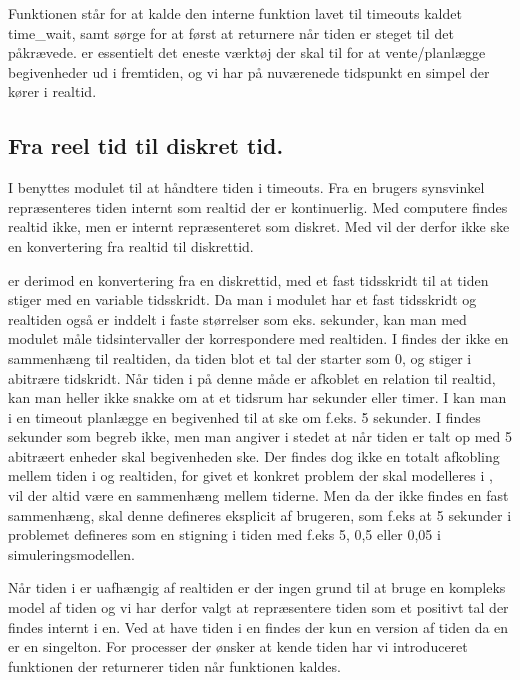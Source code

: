 Funktionen  står for at kalde den interne funktion lavet til timeouts kaldet time\_wait, samt sørge for at først at returnere når tiden er steget til det påkrævede.  er essentielt det eneste værktøj der skal til for at vente/planlægge begivenheder ud i fremtiden, og vi har på nuværenede tidspunkt en simpel \des der kører i realtid. 

\subsection{Fra reel tid til diskret tid.}\label{sec:discrete}
 I \pycsp benyttes modulet 
 til at håndtere tiden i timeouts. Fra en brugers synsvinkel
repræsenteres tiden internt som realtid der er kontinuerlig. Med computere findes realtid ikke, men  er internt repræsenteret
som diskret. Med  \des vil der derfor ikke ske en konvertering fra realtid til  diskrettid. 

\Des er derimod en konvertering fra en diskrettid, med et fast tidsskridt til at tiden stiger med en variable tidsskridt. 
Da man i  modulet har et fast tidsskridt og
realtiden også er inddelt i faste størrelser
som eks. sekunder, kan man med  modulet måle tidsintervaller der
korrespondere med realtiden. I \des findes der ikke en
sammenhæng til  realtiden, da tiden blot et tal der starter som 0, og stiger
i abitrære tidskridt. Når tiden i \des på denne måde er afkoblet
en relation til realtid, kan man heller ikke snakke om at et tidsrum
har sekunder eller timer. I \pycsp kan man i en timeout planlægge en
begivenhed til at ske om f.eks. 5 sekunder. I \des findes sekunder som
begreb ikke, men man  angiver i stedet at når tiden er talt op med 5 abitræert enheder skal
begivenheden ske. Der findes dog ikke en totalt afkobling mellem tiden i \des og realtiden, for givet et konkret problem der skal modelleres i \des, vil der altid være en sammenhæng mellem tiderne. Men da der ikke findes en fast sammenhæng, skal denne defineres eksplicit af brugeren, som f.eks at 5 sekunder i problemet defineres som en stigning i tiden med f.eks 5, 0,5 eller 0,05 i simuleringsmodellen.

Når tiden i \des er uafhængig af realtiden er der ingen grund til at bruge en kompleks model af tiden og vi har derfor valgt at repræsentere tiden som et positivt tal der findes internt i \sched en. Ved at have tiden i  \sched en findes der kun en version af tiden da  \sched en er en singelton. For processer der ønsker at kende tiden har vi
introduceret funktionen  der returnerer tiden når funktionen kaldes. 

